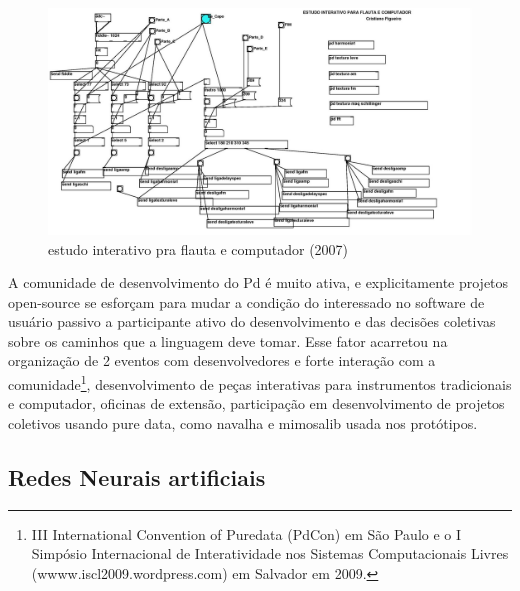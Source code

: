 \documentclass[draft]{ppgmus}
\begin{document}
\begin{figure}
\includegraphics[scale=.3]{flauta2007}
\caption{estudo interativo pra flauta e computador (2007)}
\label{flauta2007}
\end{figure} 

A comunidade de desenvolvimento do Pd é muito ativa, e explicitamente projetos open-source
se esforçam para mudar a condição do interessado no software de usuário passivo a participante ativo do desenvolvimento
e das decisões coletivas sobre os caminhos que a linguagem deve tomar. Esse  fator acarretou na
organização de 2 eventos com desenvolvedores e forte interação com a comunidade\footnote{III International
Convention of Puredata (PdCon) em São Paulo e o I Simpósio Internacional de Interatividade nos Sistemas
Computacionais Livres (wwww.iscl2009.wordpress.com) em Salvador em 2009.}, desenvolvimento de peças interativas para instrumentos
tradicionais e computador, oficinas de extensão, participação em desenvolvimento de projetos coletivos
usando pure data, como navalha e mimosalib usada nos protótipos.


\subsection{Redes Neurais artificiais}

\end{document}
